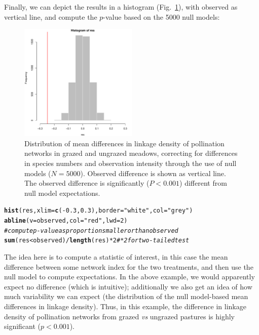 \documentclass[a4paper, 11pt]{article}\usepackage[]{graphicx}\usepackage[dvipsnames]{xcolor}
\makeatletter
\newcommand{\hlnum}[1]{\textcolor[rgb]{0.686,0.059,0.569}{#1}}%
\newcommand{\hlstr}[1]{\textcolor[rgb]{0.192,0.494,0.8}{#1}}%
\newcommand{\hlcom}[1]{\textcolor[rgb]{0.678,0.584,0.686}{\textit{#1}}}%
\newcommand{\hlopt}[1]{\textcolor[rgb]{0,0,0}{#1}}%
\newcommand{\hlstd}[1]{\textcolor[rgb]{0.345,0.345,0.345}{#1}}%
\newcommand{\hlkwc}[1]{\textcolor[rgb]{0.333,0.667,0.333}{#1}}%
\newcommand{\hlkwd}[1]{\textcolor[rgb]{0.737,0.353,0.396}{\textbf{#1}}}%
\newenvironment{kframe}{%
 \def\at@end@of@kframe{}%
 \ifinner\ifhmode%
  \def\at@end@of@kframe{\end{minipage}}%
  \begin{minipage}{\columnwidth}%
 \fi\fi%
 \def\FrameCommand##1{\hskip\@totalleftmargin \hskip-\fboxsep
 \colorbox{shadecolor}{##1}\hskip-\fboxsep
     \hskip-\linewidth \hskip-\@totalleftmargin \hskip\columnwidth}%
 \MakeFramed {\advance\hsize-\width
   \@totalleftmargin\z@ \linewidth\hsize
   \@setminipage}}%
 {\par\unskip\endMakeFramed%
 \at@end@of@kframe}
\newenvironment{knitrout}{}{} %
\makeatother
\begin{document}
Finally, we can depict the results in a histogram (Fig.~\ref{fig:cattlenull}), with observed as vertical line, and compute the $p$-value based on the 5000 null models:
%
\begin{figure}
\centering
\includegraphics[width=0.5\textwidth]{figures/cattle_nullmodelled}
\caption{Distribution of mean differences in linkage density of pollination networks in grazed and ungrazed meadows, correcting for differences in species numbers and observation intensity through the use of null models ($N=5000$). Observed difference is shown as vertical line. The observed difference is significantly ($P<0.001$) different from null model expectations.}
\label{fig:cattlenull}
\end{figure}
%
\begin{knitrout}
\color{fgcolor}\begin{kframe}
\begin{alltt}
\hlkwd{hist}\hlstd{(res,} \hlkwc{xlim}\hlstd{=}\hlkwd{c}\hlstd{(}\hlopt{-}\hlnum{0.3}\hlstd{,} \hlnum{0.3}\hlstd{),} \hlkwc{border}\hlstd{=}\hlstr{"white"}\hlstd{,} \hlkwc{col}\hlstd{=}\hlstr{"grey"}\hlstd{)}
\hlkwd{abline}\hlstd{(}\hlkwc{v}\hlstd{=observed,} \hlkwc{col}\hlstd{=}\hlstr{"red"}\hlstd{,} \hlkwc{lwd}\hlstd{=}\hlnum{2}\hlstd{)}
\hlcom{# compute p-value as proportion smaller or than observed}
\hlkwd{sum}\hlstd{(res} \hlopt{<} \hlstd{observed)}\hlopt{/}\hlkwd{length}\hlstd{(res)} \hlopt{*} \hlnum{2} \hlcom{# *2 for two-tailed test}
\end{alltt}
\end{kframe}
\end{knitrout}
%
The idea here is to compute a statistic of interest, in this case the mean difference between some network index for the two treatments, and then use the null model to compute expectations. In the above example, we would apparently expect no difference (which is intuitive); additionally we also get an idea of how much variability we can expect (the distribution of the null model-based mean differences in linkage density). Thus, in this example, the difference in linkage density of pollination networks from grazed \emph{vs} ungrazed pastures is highly significant ($p<0.001$).
\end{document}
